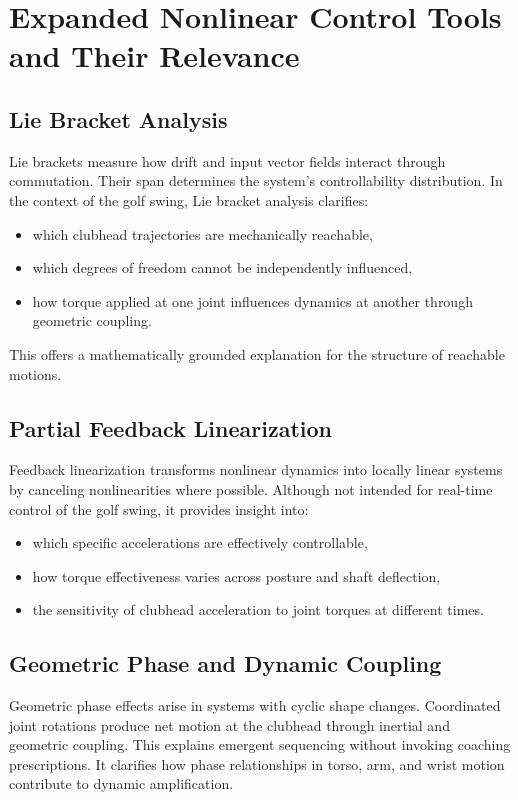 \documentclass[12pt]{article}
\begin{document}
\section{Expanded Nonlinear Control Tools and Their Relevance}

\subsection{Lie Bracket Analysis}

Lie brackets measure how drift and input vector fields interact through commutation. Their span determines the system's controllability distribution. In the context of the golf swing, Lie bracket analysis clarifies:
\begin{itemize}
\item which clubhead trajectories are mechanically reachable,
\item which degrees of freedom cannot be independently influenced,
\item how torque applied at one joint influences dynamics at another through geometric coupling.
\end{itemize}
This offers a mathematically grounded explanation for the structure of reachable motions.

\subsection{Partial Feedback Linearization}

Feedback linearization transforms nonlinear dynamics into locally linear systems by canceling nonlinearities where possible. Although not intended for real-time control of the golf swing, it provides insight into:
\begin{itemize}
\item which specific accelerations are effectively controllable,
\item how torque effectiveness varies across posture and shaft deflection,
\item the sensitivity of clubhead acceleration to joint torques at different times.
\end{itemize}

\subsection{Geometric Phase and Dynamic Coupling}

Geometric phase effects arise in systems with cyclic shape changes. Coordinated joint rotations produce net motion at the clubhead through inertial and geometric coupling. This explains emergent sequencing without invoking coaching prescriptions. It clarifies how phase relationships in torso, arm, and wrist motion contribute to dynamic amplification.
\end{document}
